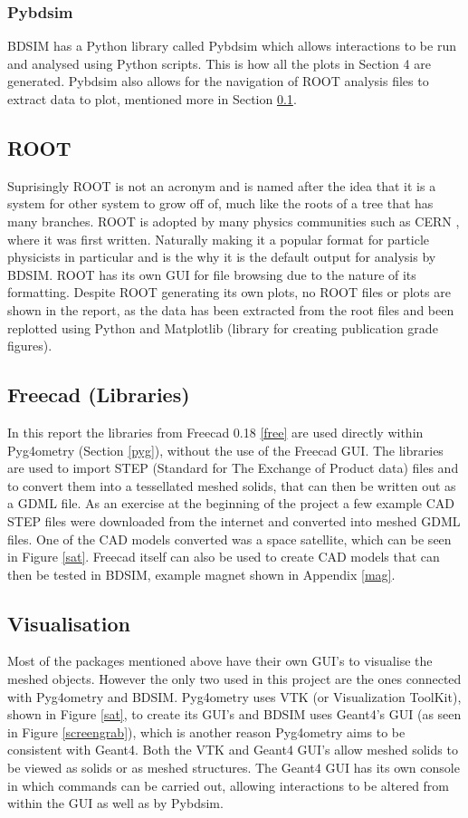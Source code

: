\documentclass[12pt,a4paper]{article}
\begin{document}
\subsubsection{Pybdsim}
\label{pyb}
BDSIM has a Python library called Pybdsim which allows interactions to be run and analysed using Python scripts. This is how all the plots in Section 4 are generated. Pybdsim also allows for the navigation of ROOT analysis files to extract data to plot, mentioned more in Section \ref{root}.

\subsection{ROOT}\label{root}
Suprisingly ROOT is not an acronym and is named after the idea that it is a system for other system to grow off of, much like the roots of a tree that has many branches. ROOT is adopted by many physics communities such as CERN \cite{cern}, where it was first written. Naturally making it a popular format for particle physicists in particular and is the why it is the default output for analysis by BDSIM. ROOT has its own GUI for file browsing due to the nature of its formatting. Despite ROOT generating its own plots, no ROOT files or plots are shown in the report, as the data has been extracted from the root files and been replotted using Python and Matplotlib (library for creating publication grade figures).

\subsection{Freecad (Libraries)}
In this report the libraries from Freecad 0.18 \ref{free} are used directly within Pyg4ometry (Section \ref{pyg}), without the use of the Freecad GUI. The libraries are used to import STEP (Standard for The Exchange of Product data) files and to convert them into a tessellated meshed solids, that can then be written out as a GDML file. As an exercise at the beginning of the project a few example CAD STEP files were downloaded from the internet and converted into meshed GDML files. One of the CAD models converted was a space satellite, which can be seen in Figure \ref{sat}. Freecad itself can also be used to create CAD models that can then be tested in BDSIM, example magnet shown in Appendix \ref{mag}.

\subsection{Visualisation}
Most of the packages mentioned above have their own GUI's to visualise the meshed objects. However the only two used in this project are the ones connected with Pyg4ometry and BDSIM. Pyg4ometry uses VTK (or Visualization ToolKit), shown in Figure \ref{sat}, to create its GUI's and BDSIM uses Geant4's GUI (as seen in Figure \ref{screengrab}), which is another reason Pyg4ometry aims to be consistent with Geant4. Both the VTK and Geant4 GUI's allow meshed solids to be viewed as solids or as meshed structures. The Geant4 GUI has its own console in which commands can be carried out, allowing interactions to be altered from within the GUI as well as by Pybdsim.
\end{document}
